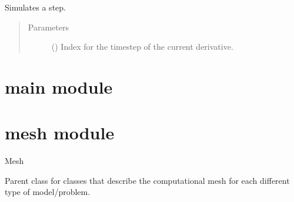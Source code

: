\documentclass[letterpaper,10pt,english]{sphinxmanual}
\begin{document}
\begin{fulllineitems}

\begin{fulllineitems}
\label{\detokenize{electrode:electrode.Electrode.simulation_step}}
\sphinxAtStartPar
Simulates a step.
\begin{quote}\begin{description}
\item[{Parameters}] \leavevmode
\sphinxAtStartPar
{} (\sphinxstyleliteralemphasis{\sphinxupquote{{[}}}\sphinxstyleliteralemphasis{\sphinxupquote{{]}}}) \textendash{} Index for the timestep of the current derivative.

\end{description}\end{quote}

\end{fulllineitems}


\end{fulllineitems}



\section{main module}
\label{\detokenize{main:main-module}}\label{\detokenize{main::doc}}

\section{mesh module}
\label{\detokenize{mesh:module-mesh}}\label{\detokenize{mesh:mesh-module}}\label{\detokenize{mesh::doc}}
\sphinxAtStartPar
Mesh

\sphinxAtStartPar
Parent class for classes that describe the computational mesh for each
different type of model/problem.
\end{document}
